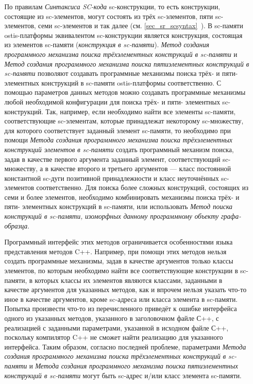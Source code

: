 По правилам \textit{Синтаксиса SC-кода} sc-конструкции, то есть конструкции, состоящие из sc-элементов, могут состоять из трёх sc-элементов, пяти sc-элементов, семи sc-элементов и так далее (см. \ref{sec_sr_scsyntax}~). В sc-памяти ostis-платформы эквивалентом sc-конструкции является конструкция, состоящая из элементов sc-памяти (\textit{конструкция в sc-памяти}). \textit{Метод создания программного механизма поиска трёхэлементных конструкций в sc-памяти} и \textit{Метод создания программного механизма поиска пятиэлементных конструкций в sc-памяти} позволяют создавать программные механизмы поиска трёх- и пяти- элементных конструкций в sc-памяти ostis-платформы соответственно. С помощью параметров данных методов можно создавать программные механизмы любой необходимой конфигурации для поиска трёх- и пяти- элементных sc-конструкций. Так, например, если необходимо найти все элементы sc-памяти, соответствующие sc-элементам, которые принадлежат некоторому sc-множеству, для которого соответствует заданный элемент sc-памяти, то необходимо при помощи \textit{Метода создания программного механизма поиска трёхэлементных конструкций элементов в sc-памяти} создать программный механизм поиска, задав в качестве первого аргумента заданный элемент, соответствующий sc-множеству, а в качестве второго и третьего аргументов --- класс постоянной константной sc-дуги позитивной принадлежности и класс неуточнённых sc-элементов соответственно. Для поиска более сложных конструкций, состоящих из семи и более элементов, необходимо комбинировать механизмы поиска трёх- и пяти- элементных конструкций в sc-памяти, или использовать \textit{Метод поиска конструкций в sc-памяти, изоморфных данному программному объекту графа-образца}.

Программный интерфейс этих методов ограничивается особенностями языка представления методов C++. Например, при помощи этих методов нельзя создать программные механизмы, задав в качестве аргументов только классы элементов, по которым необходимо найти все соответствующие конструкции в sc-памяти, в которых классы их элементов являются классами, заданными в качестве аргументов для указанных методов, как и впрочем нельзя указать что-то иное в качестве аргументов, кроме sc-адреса или класса элемента в sc-памяти. Попытка произвести что-то из перечисленного приведёт к ошибке  интерфейса одного из указанных методов, указанного в заголовочном файле С++, с реализацией с заданными параметрами, указанной в исходном файле С++, поскольку компилятор C++ не сможет найти реализацию для указанного интерфейса. Таким образом, согласно последней проблеме, параметрами \textit{Метода создания программного механизма поиска трёхэлементных конструкций в sc-памяти} и \textit{Метода создания программного механизма поиска пятиэлементных конструкций в sc-памяти} могут быть sc-адрес и/или класс элемента sc-памяти.

